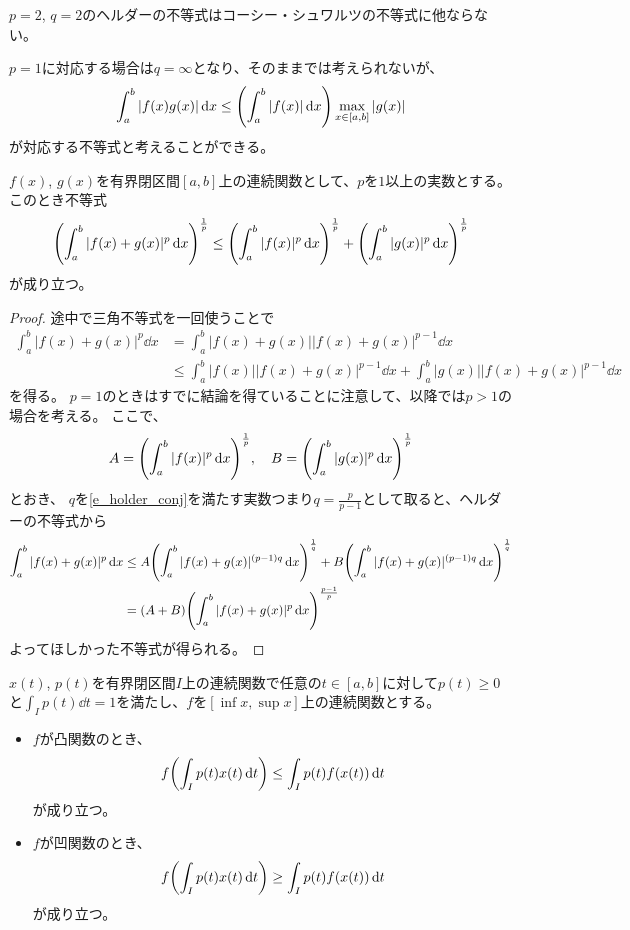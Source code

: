 \begin{remark}
$p = 2$, $q = 2$のヘルダーの不等式はコーシー・シュワルツの不等式に他ならない。
\end{remark}

\begin{remark}
$p = 1$に対応する場合は$q = \infty$となり、そのままでは考えられないが、
$$
\int_a^b |f(x)g(x)|\dd{x} \le \qty(\int_a^b |f(x)|\dd{x})\max_{x \in [a, b]}|g(x)|
$$
が対応する不等式と考えることができる。
\end{remark}

\begin{theorem}[ミンコフスキーの不等式]
$f(x)$, $g(x)$を有界閉区間$[a, b]$上の連続関数として、$p$を$1$以上の実数とする。
このとき不等式
$$
\qty(\int_a^b |f(x)+g(x)|^p\dd{x})^{\frac{1}{p}} \le \qty(\int_a^b |f(x)|^p\dd{x})^{\frac{1}{p}}+\qty(\int_a^b |g(x)|^p\dd{x})^{\frac{1}{p}}
$$
が成り立つ。
\end{theorem}

\begin{proof}
途中で三角不等式を一回使うことで
$$
\begin{aligned}
\int_a^b |f(x)+g(x)|^p\dd{x}
&= \int_a^b |f(x)+g(x)||f(x)+g(x)|^{p-1}\dd{x} \\
&\le \int_a^b |f(x)||f(x)+g(x)|^{p-1}\dd{x}+\int_a^b |g(x)||f(x)+g(x)|^{p-1}\dd{x}
\end{aligned}
$$
を得る。
$p = 1$のときはすでに結論を得ていることに注意して、以降では$p > 1$の場合を考える。
ここで、
$$
A = \qty(\int_a^b |f(x)|^p\dd{x})^{\frac{1}{p}},
\quad B = \qty(\int_a^b |g(x)|^p\dd{x})^{\frac{1}{p}}
$$
とおき、
$q$を\eqref{e_holder_conj}を満たす実数つまり$q = \frac{p}{p-1}$として取ると、ヘルダーの不等式から
$$
\begin{aligned}
\int_a^b |f(x)+g(x)|^p\dd{x}
&\le A\qty(\int_a^b |f(x)+g(x)|^{(p-1)q}\dd{x})^{\frac{1}{q}}+B\qty(\int_a^b |f(x)+g(x)|^{(p-1)q}\dd{x})^{\frac{1}{q}} \\
&= (A+B)\qty(\int_a^b |f(x)+g(x)|^p\dd{x})^{\frac{p-1}{p}}
\end{aligned}
$$
よってほしかった不等式が得られる。
\end{proof}

\begin{theorem}[イェンセンの不等式]
$x(t)$, $p(t)$を有界閉区間$I$上の連続関数で任意の$t \in [a, b]$に対して$p(t) \ge 0$と$\int_I p(t)\dd{t} = 1$を満たし、$f$を$[\inf x, \sup x]$上の連続関数とする。
\begin{itemize}
\item
$f$が凸関数のとき、
$$
f\qty(\int_I p(t)x(t)\dd{t}) \le \int_I p(t)f(x(t))\dd{t}
$$
が成り立つ。
\item
$f$が凹関数のとき、
$$
f\qty(\int_I p(t)x(t)\dd{t}) \ge \int_I p(t)f(x(t))\dd{t}
$$
が成り立つ。
\end{itemize}
\end{theorem}

